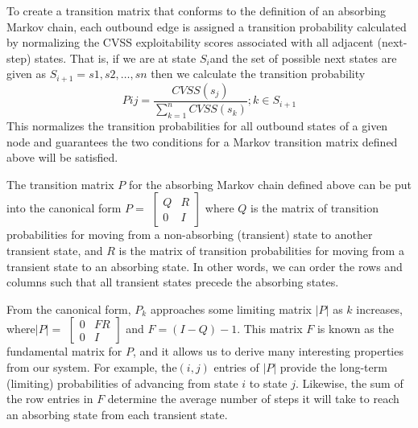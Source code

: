  

To create a transition matrix that conforms to the definition of an absorbing Markov chain, each outbound edge is assigned a transition probability calculated by normalizing the CVSS exploitability scores associated with all adjacent (next-step) states. That is, if we are at state \(S_i \)and the set of possible next states are given as \(S_{i+1} = {s1, s2, \ldots, sn}\) then we calculate the transition probability
\[ Pij =\frac{CVSS(s_j)}{\sum_{k=1}^{n}CVSS(s_k)}; k \in S_{i+1}\]
This normalizes the transition probabilities for all outbound states of a given node and guarantees the two conditions for a Markov transition matrix defined above will be satisfied.  

 

The transition matrix \( P\) for the absorbing Markov chain defined above can be put into the canonical form \( P=\)
\(\begin{bmatrix}
Q & R \\
0 & I
\end{bmatrix}\)
  where \(Q\) is the matrix of transition probabilities for moving from a non-absorbing (transient) state to another transient state, and \(R\) is the matrix of transition probabilities for moving from a transient state to an absorbing state. In other words, we can order the rows and columns such that all transient states precede the absorbing states.  

 

From the canonical form, \(P_k\) approaches some limiting matrix \(|P|\) as \(k\) increases, where\( |P|=\)
\(\begin{bmatrix}
0 & FR \\
0 & I
\end{bmatrix}\)
  and \(F = (I-Q)-1\). This matrix \(F\) is known as the fundamental matrix for \(P\), and it allows us to derive many interesting properties from our system. For example, the\( (i, j)\) entries of \(|P|\) provide the long-term (limiting) probabilities of advancing from state \(i\) to state \(j\). Likewise, the sum of the row  entries in \(F\) determine the average number of steps it will take to reach an absorbing state from each transient state. 

